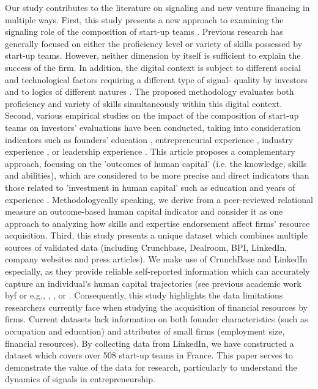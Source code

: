 \documentclass[12pt]{article}
\begin{document}
Our study contributes to the literature on signaling and new venture financing in multiple ways. First, this study presents a new approach to examining the signaling role of the composition of start-up teams \citep{beckman2007early}. Previous research has generally focused on either the proficiency level or variety of skills possessed by start-up teams. However, neither dimension by itself is sufficient to explain the success of the firm. In addition, the digital context is subject to different social and technological factors requiring a different type of signal- quality by investors and to logics of different natures \citep{nambisan2017digital}. The proposed methodology evaluates both proficiency and variety of skills simultaneously within this digital context. Second, various empirical studies on the impact of the composition of start-up teams on investors' evaluations have been conducted, taking into consideration indicators such as founders' education \citep{franke2008venture}, entrepreneurial experience \citep{beckman2007early}, industry experience \citep{becker2015new}, or leadership experience \citep{hoenig2015quality}. This article proposes a complementary approach, focusing on the 'outcomes of human capital' (i.e. the knowledge, skills and abilities), which are considered to be more precise and direct indicators than those related to 'investment in human capital' such as education and years of experience \citep{unger2011human, marvel2016human}. Methodologycally speaking, we derive from a peer-reviewed relational measure an outcome-based human capital indicator and consider it as one approach to analyzing how skills and expertise endorsement affect firms' resource acquisition. Third, this study presents a unique dataset which combines multiple sources of validated data (including Crunchbase, Dealroom, BPI, LinkedIn, company websites and press articles). We make use of CrunchBase and LinkedIn especially, as they provide reliable self-reported information which can accurately capture an individual's human capital trajectories (see previous academic work byf or e.g.,  \citet{sako2020scaling}, \citet{rapanta2017linkedin}, or \citet{reese2020should}. Consequently, this study highlights the data limitations researchers currently face when studying the acquisition of financial resources by firms. Current datasets lack information on both founder characteristics (such as occupation and education) and attributes of small firms (employment size, financial resources). By collecting data from LinkedIn, we have constructed a dataset which covers over 508 start-up teams in France. This paper serves to demonstrate the value of the data for research, particularly to understand the dynamics of signals in entrepreneurship.
\end{document}
